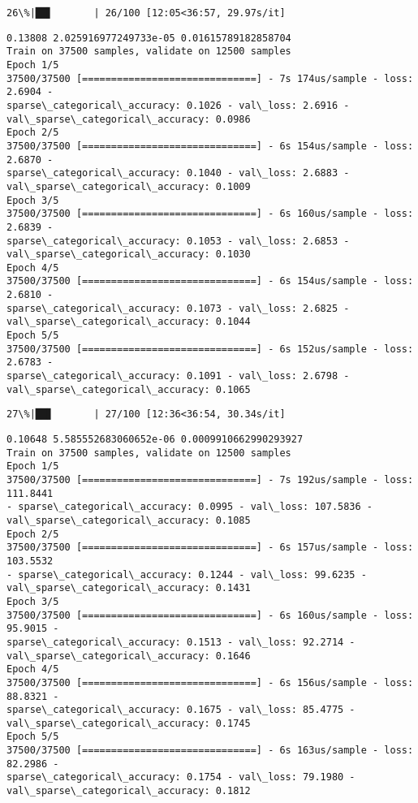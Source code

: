 \documentclass[11pt]{article}
\begin{document}
    \begin{Verbatim}[commandchars=\\\{\}]
 26\%|██▌       | 26/100 [12:05<36:57, 29.97s/it]
    \end{Verbatim}

    \begin{Verbatim}[commandchars=\\\{\}]
0.13808 2.025916977249733e-05 0.01615789182858704
Train on 37500 samples, validate on 12500 samples
Epoch 1/5
37500/37500 [==============================] - 7s 174us/sample - loss: 2.6904 -
sparse\_categorical\_accuracy: 0.1026 - val\_loss: 2.6916 -
val\_sparse\_categorical\_accuracy: 0.0986
Epoch 2/5
37500/37500 [==============================] - 6s 154us/sample - loss: 2.6870 -
sparse\_categorical\_accuracy: 0.1040 - val\_loss: 2.6883 -
val\_sparse\_categorical\_accuracy: 0.1009
Epoch 3/5
37500/37500 [==============================] - 6s 160us/sample - loss: 2.6839 -
sparse\_categorical\_accuracy: 0.1053 - val\_loss: 2.6853 -
val\_sparse\_categorical\_accuracy: 0.1030
Epoch 4/5
37500/37500 [==============================] - 6s 154us/sample - loss: 2.6810 -
sparse\_categorical\_accuracy: 0.1073 - val\_loss: 2.6825 -
val\_sparse\_categorical\_accuracy: 0.1044
Epoch 5/5
37500/37500 [==============================] - 6s 152us/sample - loss: 2.6783 -
sparse\_categorical\_accuracy: 0.1091 - val\_loss: 2.6798 -
val\_sparse\_categorical\_accuracy: 0.1065
    \end{Verbatim}

    \begin{Verbatim}[commandchars=\\\{\}]
 27\%|██▋       | 27/100 [12:36<36:54, 30.34s/it]
    \end{Verbatim}

    \begin{Verbatim}[commandchars=\\\{\}]
0.10648 5.585552683060652e-06 0.0009910662990293927
Train on 37500 samples, validate on 12500 samples
Epoch 1/5
37500/37500 [==============================] - 7s 192us/sample - loss: 111.8441
- sparse\_categorical\_accuracy: 0.0995 - val\_loss: 107.5836 -
val\_sparse\_categorical\_accuracy: 0.1085
Epoch 2/5
37500/37500 [==============================] - 6s 157us/sample - loss: 103.5532
- sparse\_categorical\_accuracy: 0.1244 - val\_loss: 99.6235 -
val\_sparse\_categorical\_accuracy: 0.1431
Epoch 3/5
37500/37500 [==============================] - 6s 160us/sample - loss: 95.9015 -
sparse\_categorical\_accuracy: 0.1513 - val\_loss: 92.2714 -
val\_sparse\_categorical\_accuracy: 0.1646
Epoch 4/5
37500/37500 [==============================] - 6s 156us/sample - loss: 88.8321 -
sparse\_categorical\_accuracy: 0.1675 - val\_loss: 85.4775 -
val\_sparse\_categorical\_accuracy: 0.1745
Epoch 5/5
37500/37500 [==============================] - 6s 163us/sample - loss: 82.2986 -
sparse\_categorical\_accuracy: 0.1754 - val\_loss: 79.1980 -
val\_sparse\_categorical\_accuracy: 0.1812
    \end{Verbatim}
\end{document}
